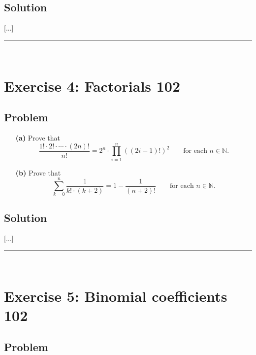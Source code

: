 \documentclass[paper=a4, fontsize=12pt]{scrartcl} %
\newcommand{\NN}{\mathbb{N}} %
\newcommand{\tup}[1]{\left( #1 \right)}
\newcommand{\horrule}[1]{\rule{\linewidth}{#1}} %
\let\sumnonlimits\sum
\let\prodnonlimits\prod
\renewcommand{\sum}{\sumnonlimits\limits}
\renewcommand{\prod}{\prodnonlimits\limits}
\theoremstyle{plainsl}
\theoremstyle{definition}
\theoremstyle{remark}
\begin{document}
\subsection{Solution}

[...]

\horrule{0.3pt} \\[0.4cm]

\section{Exercise 4: Factorials 102}

\subsection{Problem}

\begin{enumerate}

\item[\textbf{(a)}]
Prove that
\[
\dfrac{1! \cdot 2! \cdot \cdots \cdot \tup{2n}!}{n!}
= 2^n \cdot \prod_{i=1}^n \tup{\tup{2i-1}!}^2
\qquad \text{for each } n \in \NN .
\]

\item[\textbf{(b)}]
Prove that
\[
\sum_{k=0}^n \dfrac{1}{k! \cdot \tup{k+2}}
= 1 - \dfrac{1}{\tup{n+2}!}
\qquad \text{for each } n \in \NN .
\]

\end{enumerate}

\subsection{Solution}

[...]

\horrule{0.3pt} \\[0.4cm]

\section{Exercise 5: Binomial coefficients 102}

\subsection{Problem}
\end{document}
